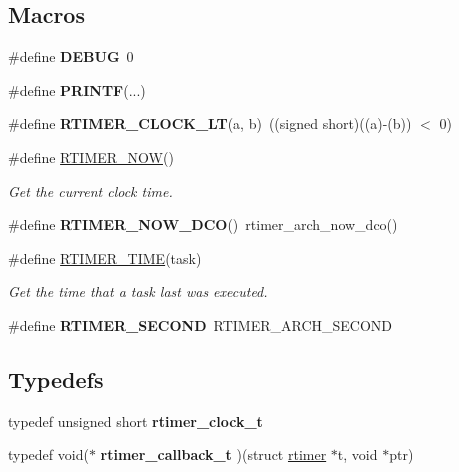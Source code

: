 \subsection*{Macros}
\begin{DoxyCompactItemize}
\item 
\hypertarget{group__rt_gad72dbcf6d0153db1b8d8a58001feed83}{\#define {\bfseries D\-E\-B\-U\-G}~0}\label{group__rt_gad72dbcf6d0153db1b8d8a58001feed83}

\item 
\hypertarget{group__rt_ga1f464e950a4fa11e8821b5c725921a15}{\#define {\bfseries P\-R\-I\-N\-T\-F}(...)}\label{group__rt_ga1f464e950a4fa11e8821b5c725921a15}

\item 
\hypertarget{group__rt_gabd8aed15a76f89a2b3ff298acd3ca938}{\#define {\bfseries R\-T\-I\-M\-E\-R\-\_\-\-C\-L\-O\-C\-K\-\_\-\-L\-T}(a, b)~((signed short)((a)-\/(b)) $<$ 0)}\label{group__rt_gabd8aed15a76f89a2b3ff298acd3ca938}

\item 
\#define \hyperlink{group__rt_gae646864933baa81ca646c96fa6f9f803}{R\-T\-I\-M\-E\-R\-\_\-\-N\-O\-W}()
\begin{DoxyCompactList}\small\item\em Get the current clock time. \end{DoxyCompactList}\item 
\hypertarget{group__rt_ga5eb87d55e442336fe3f055e9befecddc}{\#define {\bfseries R\-T\-I\-M\-E\-R\-\_\-\-N\-O\-W\-\_\-\-D\-C\-O}()~rtimer\-\_\-arch\-\_\-now\-\_\-dco()}\label{group__rt_ga5eb87d55e442336fe3f055e9befecddc}

\item 
\#define \hyperlink{group__rt_ga2884a0b98e88b6723e54e8ed0a878c61}{R\-T\-I\-M\-E\-R\-\_\-\-T\-I\-M\-E}(task)
\begin{DoxyCompactList}\small\item\em Get the time that a task last was executed. \end{DoxyCompactList}\item 
\hypertarget{group__rt_gac5b67590efc1e4abad23b658b69bf87c}{\#define {\bfseries R\-T\-I\-M\-E\-R\-\_\-\-S\-E\-C\-O\-N\-D}~R\-T\-I\-M\-E\-R\-\_\-\-A\-R\-C\-H\-\_\-\-S\-E\-C\-O\-N\-D}\label{group__rt_gac5b67590efc1e4abad23b658b69bf87c}

\end{DoxyCompactItemize}
\subsection*{Typedefs}
\begin{DoxyCompactItemize}
\item 
\hypertarget{group__rt_gae85ab49c2b0d4ae8700f0ba03b189893}{typedef unsigned short {\bfseries rtimer\-\_\-clock\-\_\-t}}\label{group__rt_gae85ab49c2b0d4ae8700f0ba03b189893}

\item 
\hypertarget{group__rt_gab199e54177db05efb8a05a1d0f541e80}{typedef void($\ast$ {\bfseries rtimer\-\_\-callback\-\_\-t} )(struct \hyperlink{structrtimer}{rtimer} $\ast$t, void $\ast$ptr)}\label{group__rt_gab199e54177db05efb8a05a1d0f541e80}

\end{DoxyCompactItemize}
